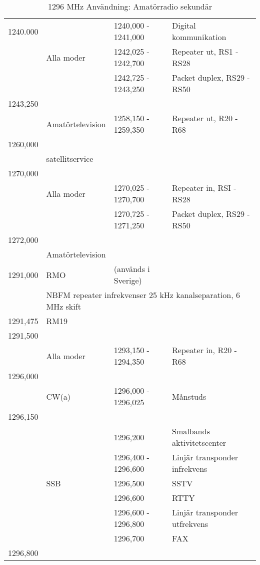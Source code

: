 \setlongtables
\begin{longtable}{llll}
\caption{1296 MHz Användning: Amatörradio sekundär} \\

1240.000 &            & 1240,000 - 1241,000 & Digital kommunikation \\
         & Alla moder & 1242,025 - 1242,700 & Repeater ut, RS1 - RS28 \\
         &            & 1242,725 - 1243,250 & Packet duplex, RS29 - RS50 \\
1243,250 & & & \\
         & Amatörtelevision & 1258,150 - 1259,350 & Repeater ut, R20 - R68 \\
1260,000 & & & \\
         & satellitservice & & \\
1270,000 & & & \\
         & Alla moder & 1270,025 - 1270,700 & Repeater in, RSI - RS28 \\
         &            & 1270,725 - 1271,250 & Packet duplex, RS29 - RS50 \\
1272,000 & & & \\
         & Amatörtelevision & & \\
1291,000 & RMO        & (används i Sverige) & \\
         & \multicolumn{3}{l}{NBFM repeater infrekvenser 25 kHz kanalseparation, 6 MHz skift} \\
1291,475 & RM19 & & \\
1291,500 & & & \\
         & Alla moder & 1293,150 - 1294,350 & Repeater in, R20 - R68 \\
1296,000 & & & \\
         & CW(a) & 1296,000 - 1296,025 & Månstuds \\
1296,150 & & & \\
         &     & 1296,200            & Smalbands aktivitetscenter \\
         &     & 1296,400 - 1296,600 & Linjär transponder infrekvens \\
         & SSB & 1296,500            & SSTV \\
         &     & 1296,600            & RTTY \\
         &     & 1296,600 - 1296,800 & Linjär transponder utfrekvens \\
         &     & 1296,700            & FAX \\
1296,800 & & & \\

\end{longtable}
